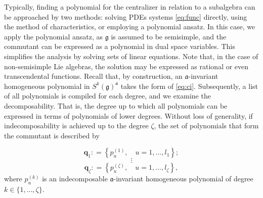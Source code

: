 \documentclass[11pt,reqno]{amsart}
\newtheorem*{theorem A}{Main Theorem A}
\newtheorem*{theorem B}{Main Theorem B}
\newtheorem*{theorem C}{Main Theorem C}
\newtheorem*{theorem D}{Main Theorem D}
\theoremstyle{definition}
\theoremstyle{plain}
\theoremstyle{conclusion}
\begin{document}
Typically, finding a polynomial for the centralizer in relation to a subalgebra can be approached by two methods: solving PDEs systems \eqref{eq:func} directly, using the method of characteristics, or employing a polynomial ansatz. In this case, we apply the polynomial ansatz, as $\mathfrak{g}$ is assumed to be semisimple, and the commutant can be expressed as a polynomial in dual space variables. This simplifies the analysis by solving sets of linear equations. Note that, in the case of non-semisimple Lie algebras, the solution may be expressed as rational or even transcendental functions.  Recall that, by construction, an $\mathfrak{a}$-invariant homogeneous polynomial in $S^k(\mathfrak{g})^\mathfrak{a}$ takes the form of \eqref{eq:ci}. Subsequently, a list of all polynomials is compiled for each degree, and we examine the decomposability. That is, the degree up to which all polynomials can be expressed in terms of polynomials of lower degrees. Without loss of generality, if indecomposability is achieved up to the degree $\zeta$, the set of polynomials that form the commutant is described by

\[ \textbf{q}_1 : = \left\{ p_u^{(1)},\quad u=1,...,l_1 \right\}; \]
\[ \vdots  \]
\[  \textbf{q}_\zeta : = \left\{p_u^{(\zeta)},\quad u=1,...,l_\zeta\right\}, \]
where $p_u^{(k)} $ is an indecomposable $\mathfrak{a}$-invariant homogeneous polynomial of degree $k \in \{1,\ldots,\zeta\}$.
\end{document}

